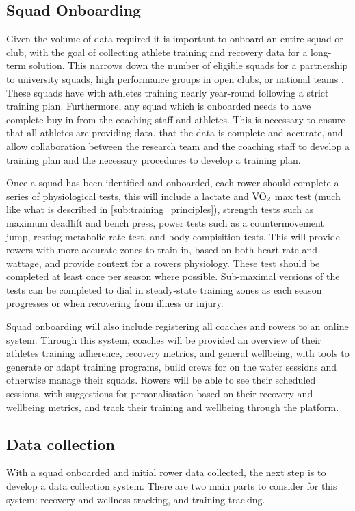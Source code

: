 \subsection{\label{sub:ideal-onboard}Squad Onboarding}
Given the volume of data required it is important to onboard an entire squad or club, with the goal of collecting athlete training and recovery data for a long-term solution. This narrows down the number of eligible squads for a partnership to university squads, high performance groups in open clubs, or national teams . These squads have with athletes training nearly year-round following a strict training plan. Furthermore, any squad which is onboarded needs to have complete buy-in from the coaching staff and athletes. This is necessary to ensure that all athletes are providing data, that the data is complete and accurate, and allow collaboration between the research team and the coaching staff to develop a training plan and the necessary procedures to develop a training plan.

Once a squad has been identified and onboarded, each rower should complete a series of physiological tests, this will include a lactate and $\textnormal{VO}_2$ max test (much like what is described in \autoref{sub:training_principles}), strength tests such as maximum deadlift and bench press, power tests such as a countermovement jump, resting metabolic rate test, and body compisition tests. This will provide rowers with more accurate zones to train in, based on both heart rate and wattage, and provide context for a rowers physiology. These test should be completed at least once per season where possible. Sub-maximal versions of the tests can be completed to dial in steady-state training zones as each season progresses or when recovering from illness or injury.

Squad onboarding will also include registering all coaches and rowers to an online system. Through this system, coaches will be provided an overview of their athletes training adherence, recovery metrics, and general wellbeing, with tools to generate or adapt training programs, build crews for on the water sessions and otherwise manage their squads. Rowers will be able to see their scheduled sessions, with suggestions for personalisation based on their recovery and wellbeing metrics, and track their training and wellbeing through the platform.

\subsection{\label{sub:ideal-data-collection}Data collection}
With a squad onboarded and initial rower data collected, the next step is to develop a data collection system. There are two main parts to consider for this system: recovery and wellness tracking, and training tracking.

